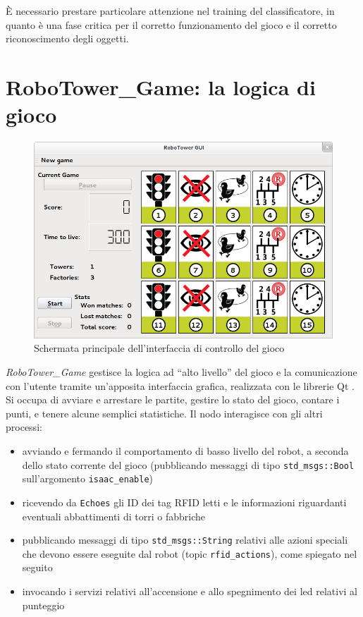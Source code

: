 
\begin{nota}
È necessario prestare particolare attenzione nel training del classificatore, in quanto è una fase critica per il corretto funzionamento del gioco e il corretto riconoscimento degli oggetti.
\end{nota}

\section{RoboTower\_Game: la logica di gioco}
\begin{figure}
\centering
\includegraphics[scale=0.43]{images/rtgame}
\caption{Schermata principale dell'interfaccia di controllo del gioco}
\end{figure}

\emph{RoboTower\_Game} gestisce la logica ad ``alto livello'' del gioco e la comunicazione con l'utente tramite un'apposita interfaccia grafica, realizzata con le librerie Qt \cite{qtweb}. Si occupa di avviare e arrestare le partite, gestire lo stato del gioco, contare i punti, e tenere alcune semplici statistiche. Il nodo interagisce con gli altri processi:
\begin{itemize}
\item avviando e fermando il comportamento di basso livello del robot, a seconda dello stato corrente del gioco (pubblicando messaggi di tipo \verb|std_msgs::Bool| sull'argomento \verb|isaac_enable|)
\item ricevendo da \verb|Echoes| gli ID dei tag RFID letti e le informazioni riguardanti eventuali abbattimenti di torri o fabbriche
\item pubblicando messaggi di tipo \verb|std_msgs::String| relativi alle azioni speciali che devono essere eseguite dal robot (topic \verb|rfid_actions|), come spiegato nel seguito
\item invocando i servizi relativi all'accensione e allo spegnimento dei led relativi al punteggio
\end{itemize}

